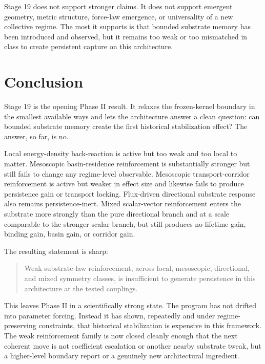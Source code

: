 \documentclass[11pt]{article}
\begin{document}
Stage 19 does not support stronger claims. It does not support emergent geometry, metric structure, force-law emergence, or universality of a new collective regime. The most it supports is that bounded substrate memory has been introduced and observed, but it remains too weak or too mismatched in class to create persistent capture on this architecture.

\section{Conclusion}

Stage 19 is the opening Phase II result. It relaxes the frozen-kernel boundary in the smallest available ways and lets the architecture answer a clean question: can bounded substrate memory create the first historical stabilization effect? The answer, so far, is no.

Local energy-density back-reaction is active but too weak and too local to matter. Mesoscopic basin-residence reinforcement is substantially stronger but still fails to change any regime-level observable. Mesoscopic transport-corridor reinforcement is active but weaker in effect size and likewise fails to produce persistence gain or transport locking. Flux-driven directional substrate response also remains persistence-inert. Mixed scalar-vector reinforcement enters the substrate more strongly than the pure directional branch and at a scale comparable to the stronger scalar branch, but still produces no lifetime gain, binding gain, basin gain, or corridor gain.

The resulting statement is sharp:

\begin{quote}
Weak substrate-law reinforcement, across local, mesoscopic, directional, and mixed symmetry classes, is insufficient to generate persistence in this architecture at the tested couplings.
\end{quote}

This leaves Phase II in a scientifically strong state. The program has not drifted into parameter forcing. Instead it has shown, repeatedly and under regime-preserving constraints, that historical stabilization is expensive in this framework. The weak reinforcement family is now closed cleanly enough that the next coherent move is not coefficient escalation or another nearby substrate tweak, but a higher-level boundary report or a genuinely new architectural ingredient.
\end{document}
